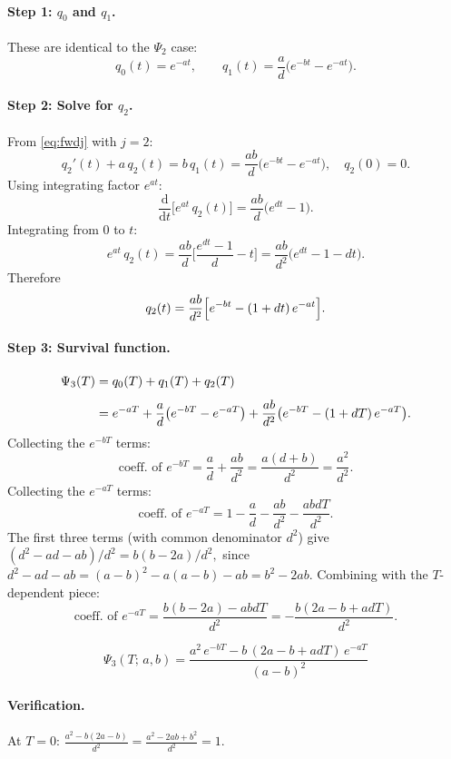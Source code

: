 \documentclass[11pt,a4paper]{article}
\newcommand{\dd}{\mathrm{d}}
\begin{document}
\paragraph{Step 1: $q_0$ and $q_1$.}
These are identical to the $\Psi_2$ case:
\[
  q_0(t) = e^{-at}, \qquad
  q_1(t) = \frac{a}{d}\bigl(e^{-bt} - e^{-at}\bigr).
\]

\paragraph{Step 2: Solve for $q_2$.}
From \eqref{eq:fwdj} with $j = 2$:
\[
  q_2'(t) + a\, q_2(t) = b\, q_1(t)
  = \frac{ab}{d}\bigl(e^{-bt} - e^{-at}\bigr), \quad q_2(0) = 0.
\]
Using integrating factor $e^{at}$:
\[
  \frac{\dd}{\dd t}\bigl[e^{at}\, q_2(t)\bigr]
  = \frac{ab}{d}\bigl(e^{dt} - 1\bigr).
\]
Integrating from $0$ to $t$:
\[
  e^{at}\, q_2(t) = \frac{ab}{d}\biggl[\frac{e^{dt} - 1}{d} - t\biggr]
  = \frac{ab}{d^2}\bigl(e^{dt} - 1 - dt\bigr).
\]
Therefore
\[
  q_2(t) = \frac{ab}{d^2}\Bigl[e^{-bt} - (1 + dt)\,e^{-at}\Bigr].
\]

\paragraph{Step 3: Survival function.}
\begin{align}
  \Psi_3(T) &= q_0(T) + q_1(T) + q_2(T) \notag\\[4pt]
  &= e^{-aT} + \frac{a}{d}\bigl(e^{-bT} - e^{-aT}\bigr)
     + \frac{ab}{d^2}\bigl(e^{-bT} - (1 + dT)\,e^{-aT}\bigr).
\end{align}
Collecting the $e^{-bT}$ terms:
\[
  \text{coeff.\ of } e^{-bT} = \frac{a}{d} + \frac{ab}{d^2}
  = \frac{a(d + b)}{d^2} = \frac{a^2}{d^2}.
\]
Collecting the $e^{-aT}$ terms:
\[
  \text{coeff.\ of } e^{-aT}
  = 1 - \frac{a}{d} - \frac{ab}{d^2} - \frac{abdT}{d^2}.
\]
The first three terms (with common denominator $d^2$) give
\(
  (d^2 - ad - ab)/d^2 = b(b-2a)/d^2,
\)
since $d^2 - ad - ab = (a-b)^2 - a(a-b) - ab = b^2 - 2ab$.
Combining with the $T$-dependent piece:
\[
  \text{coeff.\ of } e^{-aT}
  = \frac{b(b-2a) - abdT}{d^2}
  = -\frac{b(2a - b + adT)}{d^2}.
\]

\begin{equation}
\boxed{\;\Psi_3(T;\, a, b) = \frac{a^2\,e^{-bT} - b\,(2a - b + adT)\,e^{-aT}}{(a-b)^2}\;}
\label{eq:psi3}
\end{equation}

\paragraph{Verification.} At $T = 0$:
$\frac{a^2 - b(2a - b)}{d^2} = \frac{a^2 - 2ab + b^2}{d^2} = 1.$ \checkmark
\end{document}
